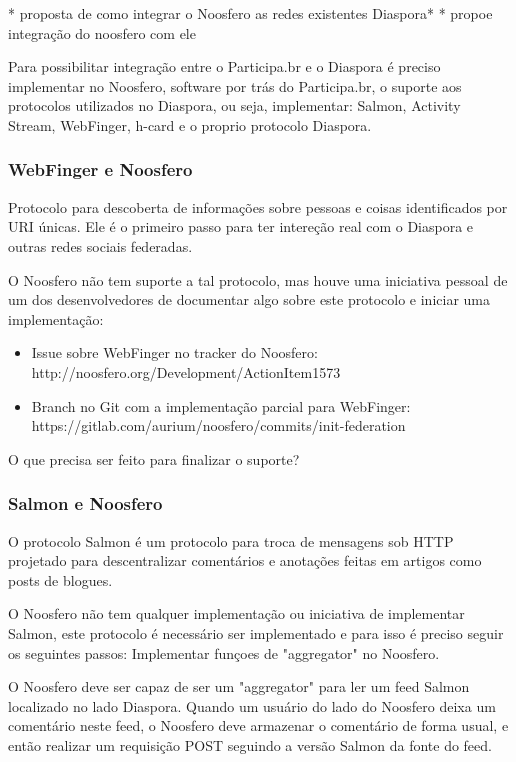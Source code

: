 \documentclass[12pt]{article}
\begin{document}
 * proposta de como integrar o Noosfero as redes existentes Diaspora*
 * propoe integração do noosfero com ele

Para possibilitar integração entre o Participa.br e o Diaspora é preciso
implementar no Noosfero, software por trás do Participa.br, o suporte aos
protocolos utilizados no Diaspora, ou seja, implementar: Salmon, Activity
Stream, WebFinger, h-card e o proprio protocolo Diaspora.

\subsubsection{WebFinger e Noosfero}

Protocolo para descoberta de informações sobre pessoas e coisas identificados
por URI únicas. Ele é o primeiro passo para ter intereção real com o Diaspora
e outras redes sociais federadas.

O Noosfero não tem suporte a tal protocolo, mas houve uma iniciativa pessoal
de um dos desenvolvedores de documentar algo sobre este protocolo e iniciar
uma implementação:

\begin{itemize}
  \item Issue sobre WebFinger no tracker do Noosfero: \\
    http://noosfero.org/Development/ActionItem1573
  \item Branch no Git com a implementação parcial para WebFinger: \\
    https://gitlab.com/aurium/noosfero/commits/init-federation
\end{itemize}

O que precisa ser feito para finalizar o suporte?

\subsubsection{Salmon e Noosfero}

O protocolo Salmon é um protocolo para troca de mensagens sob HTTP projetado
para descentralizar comentários e anotações feitas em artigos como posts de
blogues.

O Noosfero não tem qualquer implementação ou iniciativa de implementar Salmon,
este protocolo é necessário ser implementado e para isso é preciso seguir os
seguintes passos: Implementar funçoes de "aggregator" no Noosfero.

O Noosfero deve ser capaz de ser um "aggregator" para ler um feed Salmon
localizado no lado Diaspora. Quando um usuário do lado do Noosfero deixa um
comentário neste feed, o Noosfero deve armazenar o comentário de forma usual,
e então realizar um requisição POST\cite{salmon} seguindo a versão Salmon da fonte do feed.
\end{document}
